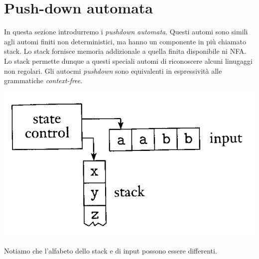 \documentclass[italian]{article}
\begin{document}
\pagebreak
\section{Push-down automata}
In questa sezione introdurremo i \textit{pushdown automata}. Questi automi sono simili agli automi finiti non deterministici, ma hanno un componente in più chiamato stack. Lo stack fornisce memoria addizionale a quella finita disponibile ni NFA. Lo stack permette dunque a questi speciali automi di riconoscere alcuni linugaggi non regolari. Gli autocmi \textit{pushdown} sono equivalenti in espressività alle grammatiche \textit{context-free}.
\begin{center}
	\includegraphics[width=0.4\linewidth]{images/pushdown_automata}
\end{center}
Notiamo che l'alfabeto dello stack e di input possono essere differenti.
\end{document}
